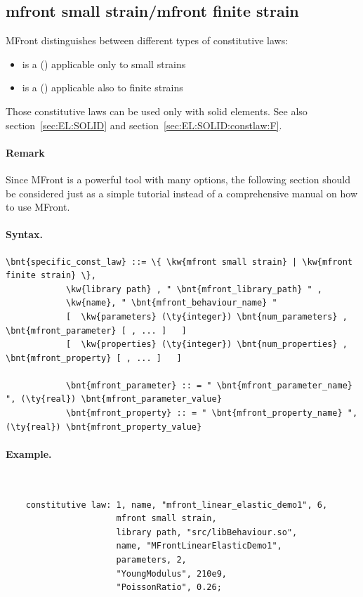 \subsection{mfront small strain/mfront finite strain}
\label{sec:CL:mfront-small-strain-finite-strain}
MFront distinguishes between different types of constitutive laws:
\begin{itemize}
\item {} is a () applicable only to small strains
\item {} is a () applicable also to finite strains
\end{itemize}
Those constitutive laws can be used only with solid elements. See also section~\ref{sec:EL:SOLID} and section~\ref{sec:EL:SOLID:constlaw:F}.
\paragraph{Remark}
Since MFront is a powerful tool with many options, the following section should be considered just as a simple tutorial instead of a comprehensive manual on how to use MFront.
\paragraph{Syntax.}
\begin{Verbatim}[commandchars=\\\{\}]
    \bnt{specific_const_law} ::= \{ \kw{mfront small strain} | \kw{mfront finite strain} \},
            \kw{library path} , " \bnt{mfront_library_path} " ,
            \kw{name}, " \bnt{mfront_behaviour_name} "
            [  \kw{parameters} (\ty{integer}) \bnt{num_parameters} , \bnt{mfront_parameter} [ , ... ]   ]
            [  \kw{properties} (\ty{integer}) \bnt{num_properties} , \bnt{mfront_property} [ , ... ]   ]

            \bnt{mfront_parameter} :: = " \bnt{mfront_parameter_name} ", (\ty{real}) \bnt{mfront_parameter_value}
            \bnt{mfront_property} :: = " \bnt{mfront_property_name} ", (\ty{real}) \bnt{mfront_property_value}
\end{Verbatim}

\paragraph{Example.} \
\begin{verbatim}
    constitutive law: 1, name, "mfront_linear_elastic_demo1", 6,
                      mfront small strain,
                      library path, "src/libBehaviour.so",
                      name, "MFrontLinearElasticDemo1",
                      parameters, 2,
                      "YoungModulus", 210e9,
                      "PoissonRatio", 0.26;
\end{verbatim}

